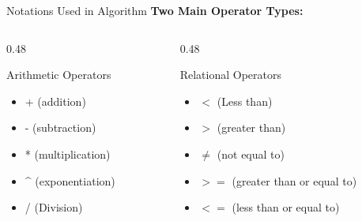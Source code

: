 \documentclass[aspectratio=169]{beamer}
\begin{document}
\begin{frame}{Notations Used in Algorithm}
    \textbf{Two Main Operator Types:}
    
    \begin{columns}
        \begin{column}{0.48\textwidth}
            \begin{block}{ Arithmetic Operators}
                \begin{itemize}
                    \item + (addition)
                    \item - (subtraction)
                    \item * (multiplication)
                    \item \^{} (exponentiation)
                    \item / (Division)
                \end{itemize}
            \end{block}
        \end{column}
        \begin{column}{0.48\textwidth}
            \begin{block}{ Relational Operators}
                \begin{itemize}
                    \item $<$ (Less than)
                    \item $>$ (greater than)
                    \item $\neq$ (not equal to)
                    \item $>=$ (greater than or equal to)
                    \item $<=$ (less than or equal to)
                \end{itemize}
            \end{block}
        \end{column}
    \end{columns}
\end{frame}
\end{document}
